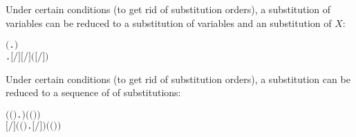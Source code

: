 \begin{lemma}
Under certain conditions (to get rid of substitution orders), a \multivariate substitution of variables
 can be reduced to a \multivariate substitution of
variables  and an \univariate substitution of $X$:
\begin{alltt}
\HOLTokenTurnstile{} \HOLSymConst{\HOLTokenNeg{}}   \HOLSymConst{\HOLTokenConj{}}   \HOLSymConst{\HOLTokenConj{}}   \HOLSymConst{\ensuremath{=}}   \HOLSymConst{\HOLTokenConj{}}
    \ensuremath{(}\HOLTokenLambda{}.  \HOLSymConst{\HOLTokenNotIn{}}  \ensuremath{)}  \HOLSymConst{\HOLTokenImp{}}
   \HOLSymConst{\HOLTokenForall{}}. \ensuremath{[}\HOLSymConst{::}\ensuremath{/}\HOLSymConst{::}\ensuremath{]}  \HOLSymConst{\ensuremath{=}} \ensuremath{[}\ensuremath{/}\ensuremath{]} \ensuremath{(}\ensuremath{[}\ensuremath{/}\ensuremath{]} \ensuremath{)}    
\end{alltt}
\end{lemma}

\begin{lemma}
Under certain conditions (to get rid of substitution orders), a
\multivariate substitution can be reduced to a sequence of
of \univariate substitutions:
\begin{alltt}
\HOLTokenTurnstile{}   \HOLSymConst{\HOLTokenConj{}}   \HOLSymConst{\ensuremath{=}}   \HOLSymConst{\HOLTokenConj{}}
    \ensuremath{(}\HOLTokenLambda{}\ensuremath{(}\HOLSymConst{,}\ensuremath{)}.   \HOLSymConst{\HOLTokenSubset{}} \HOLTokenLeftbrace{}\HOLTokenRightbrace{}\ensuremath{)} \ensuremath{(} \ensuremath{(}\HOLSymConst{,}\ensuremath{)}\ensuremath{)} \HOLSymConst{\HOLTokenImp{}}
   \ensuremath{[}\ensuremath{/}\ensuremath{]}  \HOLSymConst{\ensuremath{=}}  \ensuremath{(}\HOLTokenLambda{}\ensuremath{(}\HOLSymConst{,}\ensuremath{)} . \ensuremath{[}\ensuremath{/}\ensuremath{]} \ensuremath{)}  \ensuremath{(} \ensuremath{(}\HOLSymConst{,}\ensuremath{)}\ensuremath{)}    
\end{alltt}
\end{lemma}


